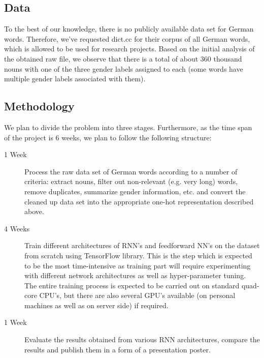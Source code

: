 \documentclass[10pt,twocolumn,letterpaper]{article}
\begin{document}
\subsection{Data}
To the best of our knowledge, there is no publicly available data set for German words. Therefore, we've requested dict.cc for their corpus of all German words, which is allowed to be used for research projects. Based on the initial analysis of the obtained raw file, we observe that there is a total of about 360 thousand nouns with one of the three gender labels assigned to each (some words have multiple gender labels associated with them).
\subsection{Methodology}
We plan to divide the problem into three stages. Furthermore, as the time span of the project is 6 weeks, we plan to follow the following structure:
\begin{description}
    \item [1 Week] Process the raw data set of German words according to a number of criteria: extract nouns, filter out non-relevant (e.g. very long) words, remove duplicates, summarize gender information, etc. and convert the cleaned up data set into the appropriate one-hot representation described above.
    \item [4 Weeks] Train different architectures of RNN's and feedforward NN's on the dataset from scratch using TensorFlow library. This is the step which is expected to be the most time-intensive as training part will require experimenting with different network architectures as well as hyper-parameter tuning. The entire training process is expected to be carried out on standard quad-core CPU's, but there are also several GPU's available (on personal machines as well as on server side) if required.
    \item [1 Week] Evaluate the results obtained from various RNN architectures, compare the results and publish them in a form of a presentation poster.
\end{description}
\end{document}
